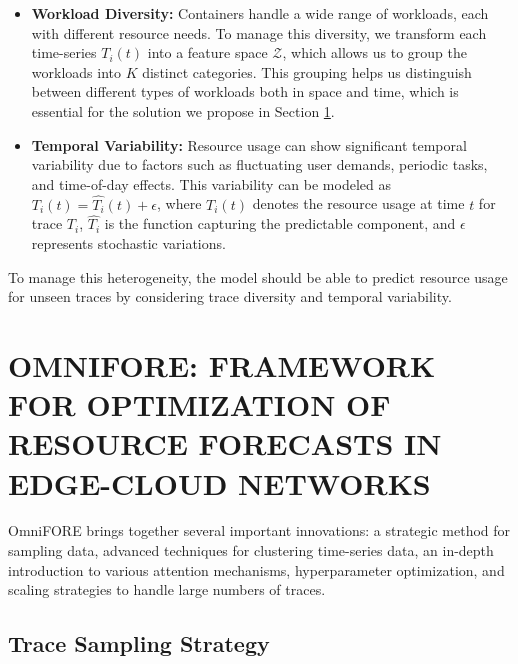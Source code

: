 \documentclass{ieeetmlcn}
\begin{document}
\begin{itemize}
    \item \textbf{Workload Diversity:} Containers handle a wide range of workloads, each with different resource needs. To manage this diversity, we transform each time-series $T_i(t)$ into a feature space $\mathcal{Z}$, which allows us to group the workloads into $K$ distinct categories. This grouping helps us distinguish between different types of workloads both in space and time, which is essential for the solution we propose in Section \ref{sec: Proposed Solution}.
    
    \item \textbf{Temporal Variability:} Resource usage can show significant temporal variability due to factors such as fluctuating user demands, periodic tasks, and time-of-day effects. This variability can be modeled as $T_i(t) = \hat{T_i}(t) + \epsilon$, where $T_i(t)$ denotes the resource usage at time $t$ for trace $T_i$, $\hat{T_i}$ is the function capturing the predictable component, and $\epsilon$ represents stochastic variations.
\end{itemize}

To manage this heterogeneity, the model should be able to predict resource usage for unseen traces by considering trace diversity and temporal variability.

\section{OMNIFORE: FRAMEWORK FOR OPTIMIZATION OF RESOURCE FORECASTS IN EDGE-CLOUD NETWORKS}
\label{sec: Proposed Solution}

OmniFORE brings together several important innovations: a strategic method for sampling data, advanced techniques for clustering time-series data, an in-depth introduction to various attention mechanisms, hyperparameter optimization, and scaling strategies to handle large numbers of traces.

\subsection{Trace Sampling Strategy}
\label{sec: Trace Sampling Strategy}
\end{document}
